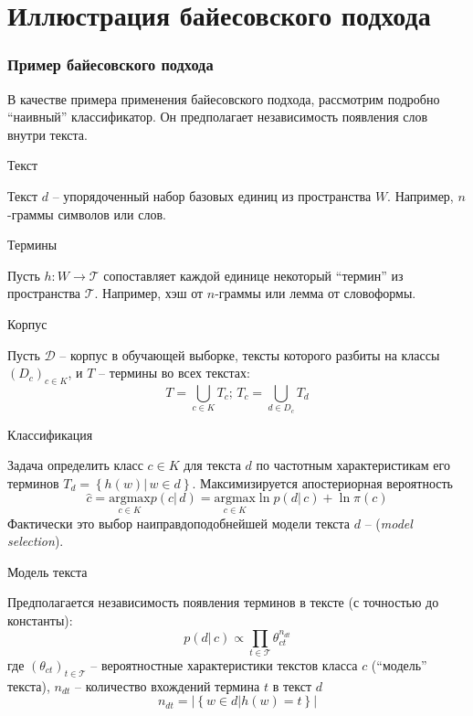 \documentclass{beamer}
\newcommand{\eng}[1]{\foreignlanguage{english}{#1}}
\newcommand{\obj}[1]{\left\{ #1 \right \}}
\newcommand{\brac}[1]{\left ( #1 \right )}
\newcommand{\induc}[1]{\left . #1 \right \vert}
\newcommand{\abs}[1]{\left | #1 \right |}
\newcommand{\Dcal}{\mathcal{D}}
\newcommand{\Tcal}{\mathcal{T}}
\begin{document}
\section{Иллюстрация байесовского подхода} %
\label{sec:bayes_demonstration}
\begin{frame}\frametitle{Пример байесовского подхода}
  \begin{block}

    В качестве примера применения байесовского подхода, рассмотрим подробно ``наивный'' классификатор. Он предполагает независимость появления слов внутри текста.
  \end{block}
  \begin{block}{Текст}

    Текст $d$ -- упорядоченный набор базовых единиц из пространства $W$.
    Например, $n$-граммы символов или слов.
  \end{block}
  \begin{block}{Термины}

    Пусть $h:W\to \Tcal$ сопоставляет каждой единице некоторый ``термин'' из пространства $\Tcal$. Например, хэш от $n$-граммы или лемма от словоформы.
  \end{block}
\end{frame}

\begin{frame}
  \begin{block}{Корпус}

    Пусть $\Dcal$ -- корпус в обучающей выборке, тексты которого разбиты на классы $\brac{D_c}_{c\in K}$, и $T$ -- термины во всех текстах:
    \[T = \bigcup_{c\in K}T_c;\,T_c = \bigcup_{d\in D_c} T_d\]
  \end{block}

  \begin{block}{Классификация}

    Задача определить класс $c\in K$ для текста $d$ по частотным характеристикам его терминов $T_d = \obj{\induc{h(w)}\,w\in d}$.
    Максимизируется апостериорная вероятность 
   \[\hat{c} = \underset{c\in K}{\text{argmax}} p\brac{\induc{c}\,d} = \underset{c\in K}{\text{argmax}} \ln p\brac{\induc{d}\,c} + \ln \pi\brac{c} \]
    Фактически это выбор наиправдоподобнейшей модели текста $d$ -- (\eng{\emph{model selection}}).
  \end{block}
\end{frame}

\begin{frame}
  \begin{block}{Модель текста}

    Предполагается независимость появления терминов в тексте (с точностью до константы):
    \[p\brac{\induc{d}\,c} \propto \prod_{t\in \Tcal}\theta_{ct}^{n_{dt}}\]
    где $\brac{\theta_{ct}}_{t\in \Tcal}$ -- вероятностные характеристики текстов класса $c$ (``модель'' текста), $n_{dt}$ -- количество вхождений термина $t$ в текст $d$
    \[n_{dt} = \abs{\obj{\induc{w\in d} h(w) = t}}\]
  \end{block}

\end{frame}
\end{document}
